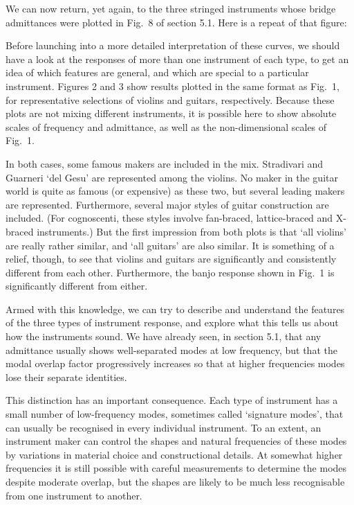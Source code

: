 

  We can now return, yet again, to the three stringed instruments whose bridge 
  admittances were plotted in Fig.\ 8 of section 5.1. Here is a repeat of that 
  figure: 

  Before launching into a more detailed interpretation of these curves, we 
  should have a look at the responses of more than one instrument of each type, 
  to get an idea of which features are general, and which are special to a 
  particular instrument. Figures 2 and 3 show results plotted in the same 
  format as Fig.\ 1, for representative selections of violins and guitars, 
  respectively. Because these plots are not mixing different instruments, it is 
  possible here to show absolute scales of frequency and admittance, as well as 
  the non-dimensional scales of Fig.\ 1. 

  In both cases, some famous makers are included in the mix. Stradivari and 
  Guarneri `del Gesu' are represented among the violins. No maker in the guitar 
  world is quite as famous (or expensive) as these two, but several leading 
  makers are represented. Furthermore, several major styles of guitar 
  construction are included. (For cognoscenti, these styles involve fan-braced, 
  lattice-braced and X-braced instruments.) But the first impression from both 
  plots is that `all violins' are really rather similar, and `all guitars' are 
  also similar. It is something of a relief, though, to see that violins and 
  guitars are significantly and consistently different from each other. 
  Furthermore, the banjo response shown in Fig.\ 1 is significantly different 
  from either. 

  Armed with this knowledge, we can try to describe and understand the features 
  of the three types of instrument response, and explore what this tells us 
  about how the instruments sound. We have already seen, in section 5.1, that 
  any admittance usually shows well-separated modes at low frequency, but that 
  the modal overlap factor progressively increases so that at higher 
  frequencies modes lose their separate identities. 

  This distinction has an important consequence. Each type of instrument has a 
  small number of low-frequency modes, sometimes called `signature modes', that 
  can usually be recognised in every individual instrument. To an extent, an 
  instrument maker can control the shapes and natural frequencies of these 
  modes by variations in material choice and constructional details. At 
  somewhat higher frequencies it is still possible with careful measurements to 
  determine the modes despite moderate overlap, but the shapes are likely to be 
  much less recognisable from one instrument to another. 

